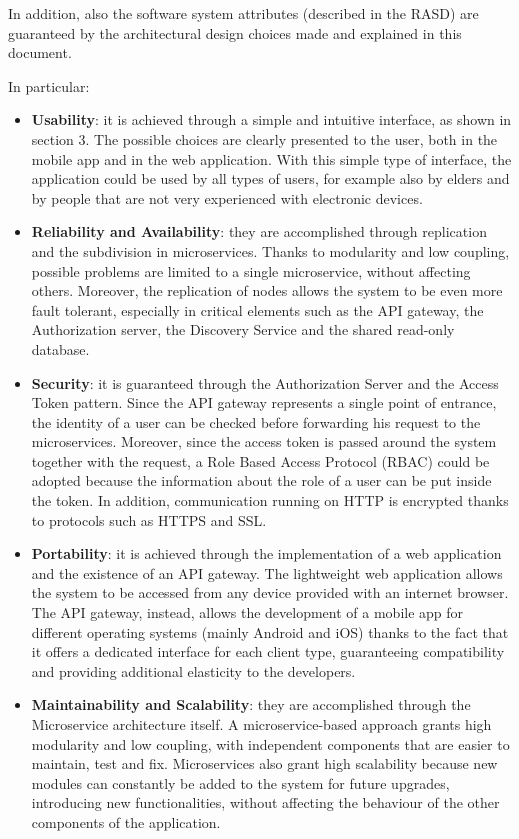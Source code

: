 In addition, also the software system attributes (described in the RASD) are guaranteed by the architectural design choices made and explained in this document.

In particular:
\begin{itemize}
    \item \textbf{Usability}: it is achieved through a simple and intuitive interface, as shown in section 3. The possible choices are clearly presented to the user, both in the mobile app and in the web application. With this simple type of interface, the application could be used by all types of users, for example also by elders and by people that are not very experienced with electronic devices.
    
    \item \textbf{Reliability and Availability}: they are accomplished through replication and the subdivision in microservices. Thanks to modularity and low coupling, possible problems are limited to a single microservice, without affecting others. Moreover, the replication of nodes allows the system to be even more fault tolerant, especially in critical elements such as the API gateway, the Authorization server, the Discovery Service and the shared read-only database. 

    \item \textbf{Security}: it is guaranteed through the Authorization Server and the Access Token pattern. Since the API gateway represents a single point of entrance, the identity of a user can be checked before forwarding his request to the microservices. Moreover, since the access token is passed around the system together with the request, a Role Based Access Protocol (RBAC) could be adopted because the information about the role of a user can be put inside the token. In addition, communication running on HTTP is encrypted thanks to protocols such as HTTPS and SSL.

    \item \textbf{Portability}: it is achieved through the implementation of a web application and the existence of an API gateway. The lightweight web application allows the system to be accessed from any device provided with an internet browser. The API gateway, instead, allows the development of a mobile app for different operating systems (mainly Android and iOS) thanks to the fact that it offers a dedicated interface for each client type, guaranteeing compatibility and providing additional elasticity to the developers.

    \item \textbf{Maintainability and Scalability}: they are accomplished through the Microservice architecture itself. A microservice-based approach grants high modularity and low coupling, with independent components that are easier to maintain, test and fix. Microservices also grant high scalability because new modules can constantly be added to the system for future upgrades, introducing new functionalities, without affecting the behaviour of the other components of the application.
\end{itemize}